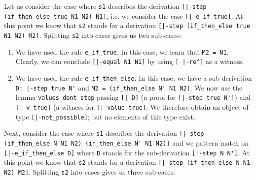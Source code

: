 Let us consider the case where \lstinline!s1! describes the derivation
\lstinline![|-step (if_then_else true N1 N2) N1]!, i.e. we consider the case
\lstinline![|-e_if_true]!. At this point we know that \lstinline!s2! stands
for a derivation \lstinline![|-step (if_then_else true N1 N2) M2]!. Splitting
\lstinline!s2! into cases gives us two sub-cases:
\begin{enumerate}
\item We have used the rule
\lstinline!e_if_true!. In this case, we learn that
\lstinline!M2 = N1!. Clearly, we can conclude \lstinline![|-equal N1 N1]! by
using \lstinline![ |-ref]! as a witness.

\item We have used the rule \lstinline!e_if_then_else!. In this case, we have a
  sub-derivation \lstinline!D: |-step true N'! and \lstinline!M2 = (if_then_else N' N1 N2)!.
We now use the lemma \lstinline!values_dont_step! passing \lstinline![|-D]! (a
proof for \lstinline![|-step true N']!) and \lstinline![|-v_true]! (a witness
for \lstinline![|-value true]!.
We therefore obtain an object of type \lstinline![|-not_possible]!; but no
elements of this type exist.
\end{enumerate}

Next, consider the case where \lstinline!s1! describes the derivation
\lstinline![|-step (if_then_else N N1 N2) (if_then_else N' N1 N2)]! and we pattern match on
\lstinline![|-e_if_then_else D]! where \lstinline!D! stands for the sub-derivation
\lstinline![|-step N N']!. At this point we know that \lstinline!s2! stands
for a derivation \lstinline![|-step (if_then_else N N1 N2) M2]!. Splitting
\lstinline!s2! into cases gives us three sub-cases:

